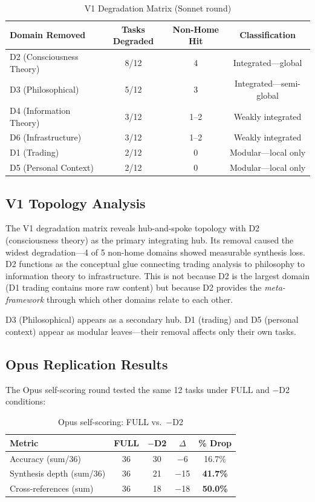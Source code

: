 \documentclass[12pt,letterpaper]{article}
\begin{document}
\begin{table}[H]
\centering
\caption{V1 Degradation Matrix (Sonnet round)}
\label{tab:v1-degradation}
\begin{tabular}{lccc}
\toprule
\textbf{Domain Removed} & \textbf{Tasks Degraded} & \textbf{Non-Home Hit} & \textbf{Classification} \\
\midrule
D2 (Consciousness Theory) & 8/12 & 4 & Integrated---global \\
D3 (Philosophical) & 5/12 & 3 & Integrated---semi-global \\
D4 (Information Theory) & 3/12 & 1--2 & Weakly integrated \\
D6 (Infrastructure) & 3/12 & 1--2 & Weakly integrated \\
D1 (Trading) & 2/12 & 0 & Modular---local only \\
D5 (Personal Context) & 2/12 & 0 & Modular---local only \\
\bottomrule
\end{tabular}
\end{table}

\subsection{V1 Topology Analysis}

The V1 degradation matrix reveals hub-and-spoke topology with D2 (consciousness theory) as the primary integrating hub. Its removal caused the widest degradation---4 of 5 non-home domains showed measurable synthesis loss. D2 functions as the conceptual glue connecting trading analysis to philosophy to information theory to infrastructure. This is not because D2 is the largest domain (D1 trading contains more raw content) but because D2 provides the \emph{meta-framework} through which other domains relate to each other.

D3 (Philosophical) appears as a secondary hub. D1 (trading) and D5 (personal context) appear as modular leaves---their removal affects only their own tasks.

\subsection{Opus Replication Results}

The Opus self-scoring round tested the same 12 tasks under FULL and $-$D2 conditions:

\begin{table}[H]
\centering
\caption{Opus self-scoring: FULL vs.\ $-$D2}
\label{tab:opus-d2}
\begin{tabular}{lcccc}
\toprule
\textbf{Metric} & \textbf{FULL} & \textbf{$-$D2} & \textbf{$\Delta$} & \textbf{\% Drop} \\
\midrule
Accuracy (sum/36) & 36 & 30 & $-$6 & 16.7\% \\
Synthesis depth (sum/36) & 36 & 21 & $-$15 & \textbf{41.7\%} \\
Cross-references (sum) & 36 & 18 & $-$18 & \textbf{50.0\%} \\
\bottomrule
\end{tabular}
\end{table}
\end{document}
